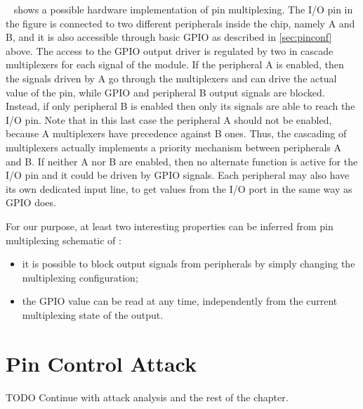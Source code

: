 \myfig{\ref{fig:pinmux}}~ shows a possible hardware implementation of pin multiplexing.
The I/O pin in the figure is connected to two different peripherals inside the chip, namely A and B,
and it is also accessible through basic GPIO as described in \sec \ref{sec:pinconf} above.
The access to the GPIO output driver is regulated by two in cascade multiplexers for each signal of the module.
If the peripheral A is enabled, then the signals driven by A go through the multiplexers and can drive the actual value of the pin,
while GPIO and peripheral B output signals are blocked. Instead, if only peripheral B is enabled then only its signals are able to reach the I/O pin.
Note that in this last case the peripheral A should not be enabled, because A multiplexers have precedence against B ones.
Thus, the cascading of multiplexers actually implements a priority mechanism between peripherals A and B.
If neither A nor B are enabled, then no alternate function is active for the I/O pin and it could be driven by GPIO signals.
Each peripheral may also have its own dedicated input line, to get values from the I/O port in the same way as GPIO does.

For our purpose, at least two interesting properties can be inferred from pin multiplexing schematic of \myfig{\ref{fig:pinmux}}:
\begin{itemize}
	\item it is possible to block output signals from peripherals by simply changing the multiplexing configuration;
	\item the GPIO value can be read at any time, independently from the current multiplexing state of the output.
\end{itemize}


\section{Pin Control Attack}

TODO Continue with attack analysis and the rest of the chapter.

